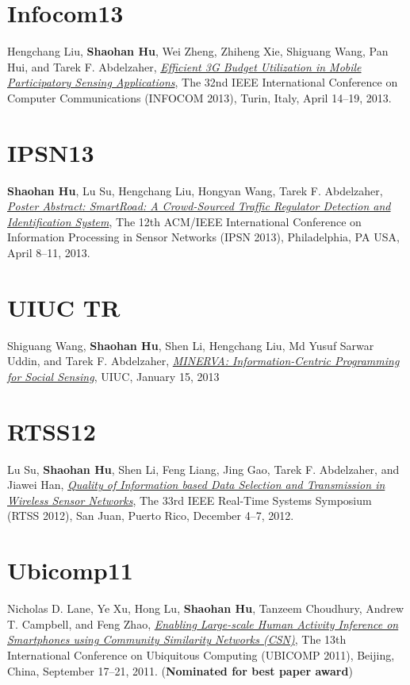 \section{\sc Infocom13}\hypertarget{liu2013infocom}{}
Hengchang Liu, \textbf{Shaohan Hu}, Wei Zheng, Zhiheng Xie, Shiguang
Wang, Pan Hui, and Tarek F. Abdelzaher, \href{http://ieeexplore.ieee.org/xpl/articleDetails.jsp?arnumber=6566935}{\emph{Efficient 3G Budget
  Utilization in Mobile Participatory Sensing Applications}},
\textsf{The 32nd IEEE International Conference on Computer
  Communications (INFOCOM 2013)}, Turin, Italy, April 14--19, 2013.

\section{\sc IPSN13}\hypertarget{hu2013ipsn}{}
\textbf{Shaohan Hu}, Lu Su, Hengchang Liu, Hongyan Wang, Tarek F.
Abdelzaher, \href{http://portal.acm.org/citation.cfm?id=2461433}{\emph{Poster Abstract: SmartRoad: A Crowd-Sourced Traffic
  Regulator Detection and Identification System}}, \textsf{The 12th
  ACM/IEEE International Conference on Information Processing in
  Sensor Networks (IPSN 2013)}, Philadelphia, PA USA, April 8--11, 2013.

\section{\sc UIUC TR}\hypertarget{wang2013uiuc}{}
Shiguang Wang, \textbf{Shaohan Hu}, Shen Li, Hengchang Liu, Md Yusuf
Sarwar Uddin, and Tarek F. Abdelzaher, \href{https://www.ideals.illinois.edu/handle/2142/42511}{\emph{MINERVA: Information-Centric
  Programming for Social Sensing}}, \textsf{UIUC}, January 15, 2013

\section{\sc RTSS12}\hypertarget{su2012rtss}{}
Lu Su, \textbf{Shaohan Hu}, Shen Li, Feng Liang, Jing Gao, Tarek
F. Abdelzaher, and Jiawei Han, \href{http://ieeexplore.ieee.org/xpl/articleDetails.jsp?arnumber=6424815}{\emph{Quality of Information based Data
  Selection and Transmission in Wireless Sensor Networks}}, \textsf{The
  33rd IEEE Real-Time Systems Symposium (RTSS 2012)}, San Juan, Puerto
Rico, December 4--7, 2012.

\section{\sc Ubicomp11}\hypertarget{lane2011ubicomp}{}
Nicholas D. Lane, Ye Xu, Hong Lu, \textbf{Shaohan Hu}, Tanzeem
Choudhury, Andrew T. Campbell, and Feng Zhao, \href{http://portal.acm.org/citation.cfm?id=2030160}{\emph{Enabling
  Large-scale Human Activity Inference on Smartphones using Community
  Similarity Networks (CSN)}}, \textsf{The 13th International
  Conference on Ubiquitous Computing (UBICOMP 2011)}, Beijing, China,
September 17--21, 2011. (\textbf{Nominated for best paper award})

